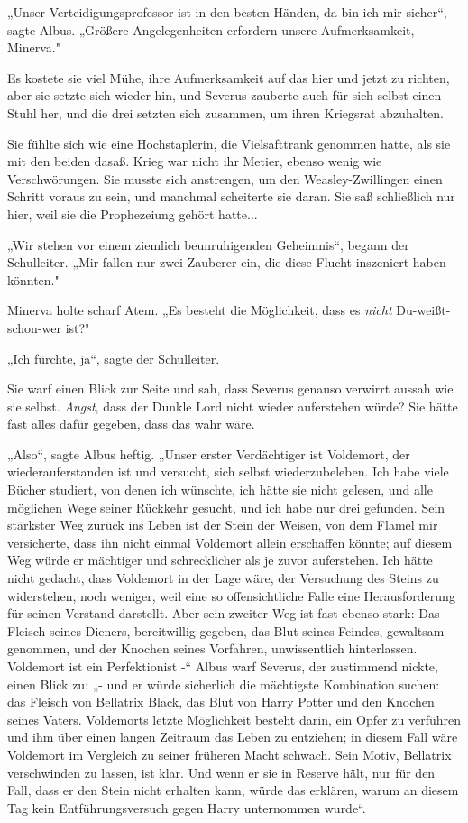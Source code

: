 {„Unser Verteidigungsprofessor ist in den besten Händen, da bin ich mir sicher“, sagte Albus. „Größere Angelegenheiten erfordern unsere Aufmerksamkeit, Minerva."

Es kostete sie viel Mühe, ihre Aufmerksamkeit auf das hier und jetzt zu richten, aber sie setzte sich wieder hin, und Severus zauberte auch für sich selbst einen Stuhl her, und die drei setzten sich zusammen, um ihren Kriegsrat abzuhalten.

Sie fühlte sich wie eine Hochstaplerin, die Vielsafttrank genommen hatte, als sie mit den beiden dasaß. Krieg war nicht ihr Metier, ebenso wenig wie Verschwörungen. Sie musste sich anstrengen, um den Weasley-Zwillingen einen Schritt voraus zu sein, und manchmal scheiterte sie daran. Sie saß schließlich nur hier, weil sie die Prophezeiung gehört hatte...

„Wir stehen vor einem ziemlich beunruhigenden Geheimnis“, begann der Schulleiter. „Mir fallen nur zwei Zauberer ein, die diese Flucht inszeniert haben könnten."

Minerva holte scharf Atem. „Es besteht die Möglichkeit, dass es \emph{nicht} Du-weißt-schon-wer ist?"

„Ich fürchte, ja“, sagte der Schulleiter.

Sie warf einen Blick zur Seite und sah, dass Severus genauso verwirrt aussah wie sie selbst. \emph{Angst}, dass der Dunkle Lord nicht wieder auferstehen würde? Sie hätte fast alles dafür gegeben, dass das wahr wäre.

„Also“, sagte Albus heftig. „Unser erster Verdächtiger ist Voldemort, der wiederauferstanden ist und versucht, sich selbst wiederzubeleben. Ich habe viele Bücher studiert, von denen ich wünschte, ich hätte sie nicht gelesen, und alle möglichen Wege seiner Rückkehr gesucht, und ich habe nur drei gefunden. Sein stärkster Weg zurück ins Leben ist der Stein der Weisen, von dem Flamel mir versicherte, dass ihn nicht einmal Voldemort allein erschaffen könnte; auf diesem Weg würde er mächtiger und schrecklicher als je zuvor auferstehen. Ich hätte nicht gedacht, dass Voldemort in der Lage wäre, der Versuchung des Steins zu widerstehen, noch weniger, weil eine so offensichtliche Falle eine Herausforderung für seinen Verstand darstellt. Aber sein zweiter Weg ist fast ebenso stark: Das Fleisch seines Dieners, bereitwillig gegeben, das Blut seines Feindes, gewaltsam genommen, und der Knochen seines Vorfahren, unwissentlich hinterlassen. Voldemort ist ein Perfektionist -“ Albus warf Severus, der zustimmend nickte, einen Blick zu: „- und er würde sicherlich die mächtigste Kombination suchen: das Fleisch von Bellatrix Black, das Blut von Harry Potter und den Knochen seines Vaters. Voldemorts letzte Möglichkeit besteht darin, ein Opfer zu verführen und ihm über einen langen Zeitraum das Leben zu entziehen; in diesem Fall wäre Voldemort im Vergleich zu seiner früheren Macht schwach. Sein Motiv, Bellatrix verschwinden zu lassen, ist klar. Und wenn er sie in Reserve hält, nur für den Fall, dass er den Stein nicht erhalten kann, würde das erklären, warum an diesem Tag kein Entführungsversuch gegen Harry unternommen wurde“.

}
